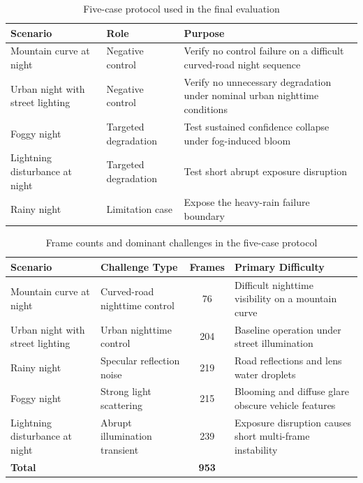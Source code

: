 \documentclass[pdflatex,sn-mathphys-num]{sn-jnl}%
\theoremstyle{thmstyleone}%
\theoremstyle{thmstyletwo}%
\theoremstyle{thmstylethree}%
\begin{document}
\begin{table}[t]
\centering
\caption{Five-case protocol used in the final evaluation}
\label{tab:testset}
\begin{tabularx}{\textwidth}{Y l Y}
\toprule
\textbf{Scenario} & \textbf{Role} & \textbf{Purpose} \\
\midrule
Mountain curve at night & Negative control & Verify no control failure on a difficult curved-road night sequence \\
Urban night with street lighting & Negative control & Verify no unnecessary degradation under nominal urban nighttime conditions \\
Foggy night & Targeted degradation & Test sustained confidence collapse under fog-induced bloom \\
Lightning disturbance at night & Targeted degradation & Test short abrupt exposure disruption \\
Rainy night & Limitation case & Expose the heavy-rain failure boundary \\
\bottomrule
\end{tabularx}
\end{table}

\begin{table}[t]
\centering
\caption{Frame counts and dominant challenges in the five-case protocol}
\label{tab:testset_counts}
{\small
\setlength{\tabcolsep}{5pt}
\begin{tabularx}{\textwidth}{Y Y c Y}
\toprule
\textbf{Scenario} & \textbf{Challenge Type} & \textbf{Frames} & \textbf{Primary Difficulty} \\
\midrule
Mountain curve at night & Curved-road nighttime control & 76 & Difficult nighttime visibility on a mountain curve \\
Urban night with street lighting & Urban nighttime control & 204 & Baseline operation under street illumination \\
Rainy night & Specular reflection noise & 219 & Road reflections and lens water droplets \\
Foggy night & Strong light scattering & 215 & Blooming and diffuse glare obscure vehicle features \\
Lightning disturbance at night & Abrupt illumination transient & 239 & Exposure disruption causes short multi-frame instability \\
\midrule
\textbf{Total} & & \textbf{953} & \\
\bottomrule
\end{tabularx}
}
\end{table}
\end{document}
